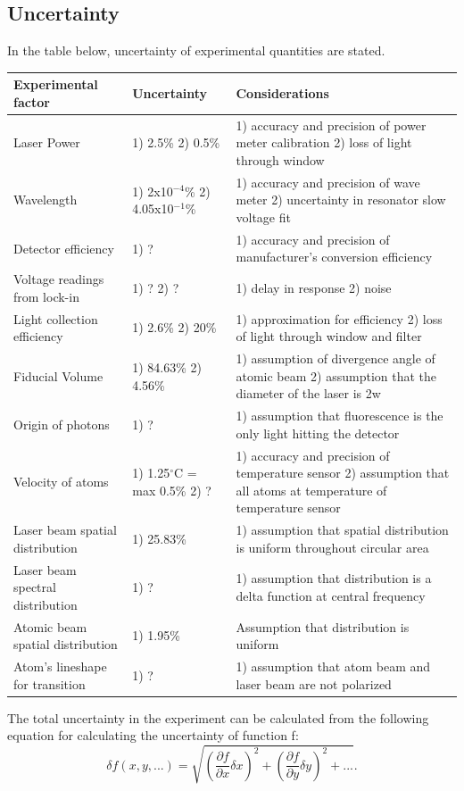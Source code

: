 \documentclass[12pt, a4paper]{article}
\begin{document}
\subsection{Uncertainty}
In the table below, uncertainty of experimental quantities are stated.
\begin{center}
\begin{tabular}{||p{3cm}|p{3cm}|p{8cm}||}
\hline
Experimental factor & Uncertainty & Considerations\\
\hline\hline
 Laser Power & 1) 2.5\% 2) 0.5\% & 1) accuracy and precision of power meter calibration 2) loss of light through window\\
\hline
 Wavelength & 1) 2x10$^{-4}$\%  2) 4.05x10$^{-1}$\%& 1) accuracy and precision of wave meter 2) uncertainty in resonator slow voltage fit\\
\hline
 Detector efficiency & 1) ? & 1) accuracy and precision of manufacturer's conversion efficiency\\
\hline 
 Voltage readings from lock-in & 1) ? 2) ?& 1) delay in response 2) noise \\
\hline
 Light collection efficiency & 1) 2.6\% 2) 20\%& 1) approximation for efficiency 2) loss of light through window and filter\\
\hline
 Fiducial Volume & 1) 84.63\% 2) 4.56\% & 1) assumption of divergence angle of atomic beam 2) assumption that the diameter of the laser is 2w\\
\hline
 Origin of photons &  1) ? & 1) assumption that fluorescence is the only light hitting the detector\\
\hline
 Velocity of atoms & 1) 1.25$^{\circ}$C = max 0.5\% 2) ? & 1) accuracy and precision of temperature sensor 2) assumption that all atoms at temperature of temperature sensor \\
\hline
 Laser beam spatial distribution & 1) 25.83\% & 1) assumption that spatial distribution is uniform throughout circular area \\
\hline
 Laser beam spectral distribution & 1) ? & 1) assumption that distribution is a delta function at central frequency \\
\hline
 Atomic beam spatial distribution & 1) 1.95\% & Assumption that distribution is uniform \\
 \hline
 Atom's lineshape for transition & 1) ?  & 1) assumption that atom beam and laser beam are not polarized\\
 \hline
\end{tabular}
\end{center}
The total uncertainty in the experiment can be calculated from the following equation for calculating the uncertainty of function f:
\begin{equation}
\delta f(x,y,...) = \sqrt{(\frac{\partial f}{\partial x}\delta x)^2 + (\frac{\partial f}{\partial y}\delta y)^2 + ... }.
\end{equation}
\end{document}
